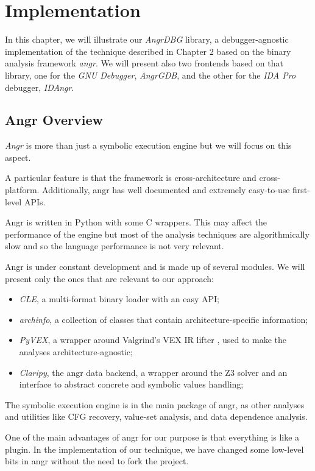 \chapter{Implementation}

In this chapter, we will illustrate our {\em AngrDBG} library, a debugger-agnostic implementation of the technique described in Chapter 2 based on the binary analysis framework {\em angr}. We will present also two frontends based on that library, one for the {\em GNU Debugger}, {\em AngrGDB}, and the other for the {\em IDA Pro} debugger, {\em IDAngr}.

\section{Angr Overview}

{\em Angr} \cite{shoshitaishvili2016state} is more than just a symbolic execution engine but we will focus on this aspect.

A particular feature is that the framework is cross-architecture and cross-platform. Additionally, angr has well documented and extremely easy-to-use first-level APIs.

Angr is written in Python with some C wrappers. This may affect the performance of the engine but most of the analysis techniques are algorithmically slow and so the language performance is not very relevant.

Angr is under constant development and is made up of several modules. We will present only the ones that are relevant to our approach:

\begin{itemize}
\item {\em CLE}, a multi-format binary loader with an easy API;
\item {\em archinfo}, a collection of classes that contain architecture-specific information;
\item {\em PyVEX}, a wrapper around Valgrind's VEX IR lifter \cite{Net:phd2004}, used to make the analyses architecture-agnostic;
\item {\em Claripy}, the angr data backend, a wrapper around the Z3 solver and an interface to abstract concrete and symbolic values handling;
\end{itemize}

The symbolic execution engine is in the main package of angr, as other analyses and utilities like CFG recovery, value-set analysis, and data dependence analysis.

One of the main advantages of angr for our purpose is that everything is like a plugin. In the implementation of our technique, we have changed some low-level bits in angr without the need to fork the project.

